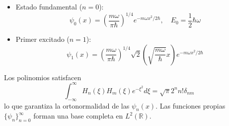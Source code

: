 \documentclass[main.tex]{subfiles}
\begin{document}
\begin{itemize}
\item Estado fundamental ($n=0$):
\begin{equation}
\psi_0(x) = \left(\frac{m\omega}{\pi\hbar}\right)^{1/4}e^{-m\omega x^2/2\hbar}, \quad E_0 = \frac{1}{2}\hbar\omega
\end{equation}

\item Primer excitado ($n=1$):
\begin{equation}
\psi_1(x) = \left(\frac{m\omega}{\pi\hbar}\right)^{1/4}\sqrt{2}\left(\sqrt{\frac{m\omega}{\hbar}}x\right)e^{-m\omega x^2/2\hbar}
\end{equation}
\end{itemize}

Los polinomios satisfacen
\begin{equation}
\int_{-\infty}^\infty H_n(\xi)H_m(\xi)e^{-\xi^2}d\xi = \sqrt{\pi}2^n n! \delta_{nm}
\end{equation}
lo que garantiza la ortonormalidad de las $\psi_n(x)$.
Las funciones propias $\{\psi_n\}_{n=0}^\infty$ forman una base completa en $L^2(\mathbb{R})$.
\end{document}
